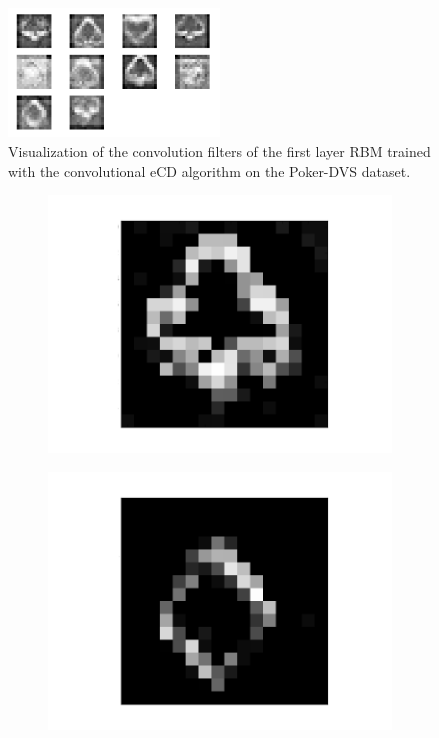 \begin{figure}[h!]
	\centering
    	\includegraphics[width=0.5\textwidth]{imgs/poker/w2.png} 
    \caption{Visualization of the convolution filters of the first layer RBM trained with the convolutional eCD algorithm on the Poker-DVS dataset.}
	\label{fig:pokerw}
\end{figure}


\begin{figure}[h!]
	\centering
	\begin{subfigure}{.25\textwidth}
  		\centering
  		\includegraphics[width=.6\linewidth]{imgs/poker/recon_img5.png}
  		\label{fig:sub1}
	\end{subfigure}%
	\begin{subfigure}{.25\textwidth}
  		\centering
  		\includegraphics[width=.6\linewidth]{imgs/poker/recon_img3.png}
  		\label{fig:sub1}
	\end{subfigure}%
	\begin{subfigure}{.25\textwidth}

\end{subfigure}
\end{figure}
